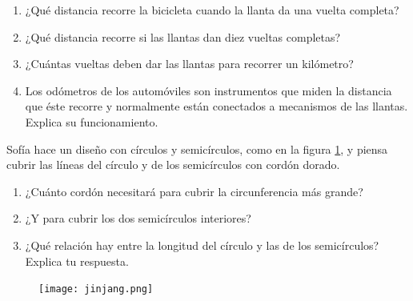 \documentclass[11pt]{book}
\begin{document}
\begin{enumerate}
\begin{minipage}[t]{0.7\textwidth}
          \begin{enumerate}
            \item ¿Qué distancia recorre la bicicleta cuando la llanta da una vuelta completa?\\
            \item ¿Qué distancia recorre si las llantas dan diez vueltas completas?\\
            \item ¿Cuántas vueltas deben dar las llantas para recorrer un kilómetro?\\
            \item Los odómetros de los automóviles son instrumentos que miden la distancia que éste
                  recorre y normalmente están conectados a mecanismos de las llantas. Explica su funcionamiento.
          \end{enumerate}
        \end{minipage}

        \begin{minipage}[t]{0.7\textwidth}
          \item Sofía hace un diseño con círculos y semicírculos, como en la figura \ref{fig:jinjang}, y piensa
          cubrir las líneas del círculo y de los semicírculos con cordón dorado.
          \begin{enumerate}
            \item ¿Cuánto cordón necesitará para cubrir la circunferencia más grande?\\
            \item ¿Y para cubrir los dos semicírculos interiores?\\
            \item ¿Qué relación hay entre la longitud del círculo y las de los semicírculos? Explica tu respuesta.
          \end{enumerate}
        \end{minipage}\hfill
        \begin{minipage}[t]{0.2\textwidth}
          \begin{figure}[H]
            \centering
            \texttt{[image: jinjang.png]}
            \label{fig:jinjang}
          \end{figure}
        \end{minipage}



\end{enumerate}
\end{document}
